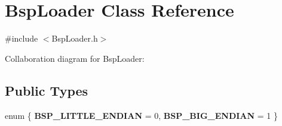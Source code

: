 \hypertarget{class_bsp_loader}{\section{Bsp\+Loader Class Reference}
\label{class_bsp_loader}
}


{\ttfamily \#include $<$Bsp\+Loader.\+h$>$}



Collaboration diagram for Bsp\+Loader\+:
\subsection*{Public Types}
\begin{DoxyCompactItemize}
\item 
\hypertarget{class_bsp_loader_a2f0bf4eddd90b45fe515e9bd743053b5}{enum \{ {\bfseries B\+S\+P\+\_\+\+L\+I\+T\+T\+L\+E\+\_\+\+E\+N\+D\+I\+A\+N} = 0, 
{\bfseries B\+S\+P\+\_\+\+B\+I\+G\+\_\+\+E\+N\+D\+I\+A\+N} = 1
 \}}\label{class_bsp_loader_a2f0bf4eddd90b45fe515e9bd743053b5}

\end{DoxyCompactItemize}
